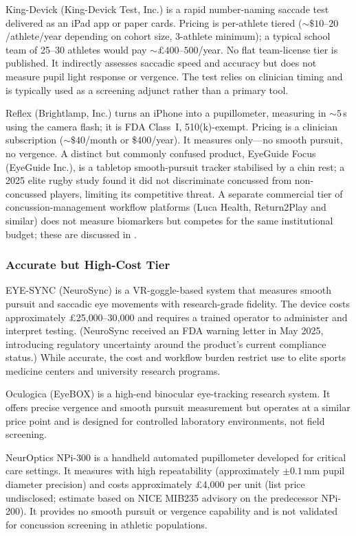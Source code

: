 King-Devick (King-Devick Test, Inc.) is a rapid number-naming saccade test delivered as an iPad app or paper cards. Pricing is per-athlete tiered (${\sim}\$10$--$20$/athlete/year depending on cohort size, 3-athlete minimum); a typical school team of 25--30 athletes would pay ${\sim}\pounds 400$--$500$/year. No flat team-license tier is published. It indirectly assesses saccadic speed and accuracy but does not measure pupil light response or vergence. The test relies on clinician timing and is typically used as a screening adjunct rather than a primary tool.

Reflex (Brightlamp, Inc.) turns an iPhone into a pupillometer, measuring  in ${\sim}5$\,s using the camera flash; it is FDA Class~I, 510(k)-exempt. Pricing is a clinician subscription (${\sim}\$40$/month or \$400/year). It measures  only---no smooth pursuit, no vergence. A distinct but commonly confused product, EyeGuide Focus (EyeGuide Inc.), is a tabletop smooth-pursuit tracker stabilised by a chin rest; a 2025 elite rugby study found it did not discriminate concussed from non-concussed players, limiting its competitive threat. A separate commercial tier of concussion-management workflow platforms (Luca Health, Return2Play and similar) does not measure biomarkers but competes for the same institutional budget; these are discussed in .

\subsubsection*{Accurate but High-Cost Tier}

EYE-SYNC (NeuroSync) is a VR-goggle-based system that measures smooth pursuit and saccadic eye movements with research-grade fidelity. The device costs approximately \pounds 25{,}000--30{,}000 and requires a trained operator to administer and interpret testing. (NeuroSync received an FDA warning letter in May 2025, introducing regulatory uncertainty around the product's current compliance status.) While accurate, the cost and workflow burden restrict use to elite sports medicine centers and university research programs.

Oculogica (EyeBOX) is a high-end binocular eye-tracking research system. It offers precise vergence and smooth pursuit measurement but operates at a similar price point and is designed for controlled laboratory environments, not field screening.

NeurOptics NPi-300 is a handheld automated pupillometer developed for critical care settings. It measures  with high repeatability (approximately $\pm 0.1$\,mm pupil diameter precision) and costs approximately \pounds 4{,}000 per unit (list price undisclosed; estimate based on NICE MIB235 advisory on the predecessor NPi-200). It provides no smooth pursuit or vergence capability and is not validated for concussion screening in athletic populations.


